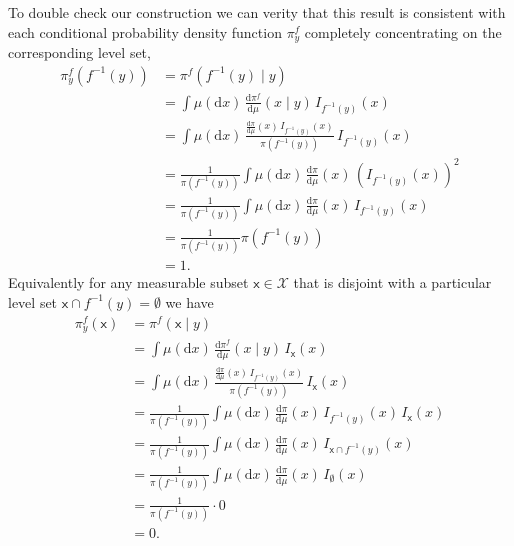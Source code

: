 \documentclass[
  letterpaper,
  DIV=11,
  numbers=noendperiod]{scrartcl}
\begin{document}
To double check our construction we can verity that this result is
consistent with each conditional probability density function
\(\pi^{f}_{y}\) completely concentrating on the corresponding level set,
\begin{align*}
\pi^{f}_{y}( f^{-1}(y) )
&=
\pi^{f}( f^{-1}(y) \mid y)
\\
&=
\int \mu( \mathrm{d} x) \, \frac{ \mathrm{d}  \pi^{f} }{ \mathrm{d}  \mu  }( x \mid y ) \,
I_{f^{-1}(y)}(x)
\\
&=
\int \mu( \mathrm{d} x) \,
\frac{ \frac{ \mathrm{d}  \pi }{ \mathrm{d}  \mu  }(x) \, I_{f^{-1}(y)}(x) }{ \pi ( f^{-1}(y) ) }
\,
I_{f^{-1}(y)}(x)
\\
&=
\frac{1}{ \pi ( f^{-1}(y) ) }
\int \mu( \mathrm{d} x) \, \frac{ \mathrm{d}  \pi }{ \mathrm{d}  \mu  }(x) \,
\left( I_{f^{-1}(y)}(x) \right)^{2}
\\
&=
\frac{1}{ \pi ( f^{-1}(y) ) }
\int \mu( \mathrm{d} x) \, \frac{ \mathrm{d}  \pi }{ \mathrm{d}  \mu  }(x) \,
I_{f^{-1}(y)}(x)
\\
&=
\frac{1}{ \pi ( f^{-1}(y) ) }
\pi( f^{-1}(y) )
\\
&=
1.
\end{align*} Equivalently for any measurable subset
\(\mathsf{x} \in \mathcal{X}\) that is disjoint with a particular level
set \(\mathsf{x} \cap f^{-1}(y) = \emptyset\) we have \begin{align*}
\pi^{f}_{y}( \mathsf{x} )
&=
\pi^{f}( \mathsf{x} \mid y)
\\
&=
\int \mu( \mathrm{d} x) \, \frac{ \mathrm{d}  \pi^{f} }{ \mathrm{d}  \mu  }( x \mid y ) \,
I_{\mathsf{x}}(x)
\\
&=
\int \mu( \mathrm{d} x) \,
\frac{ \frac{ \mathrm{d}  \pi }{ \mathrm{d}  \mu  }(x) \, I_{f^{-1}(y)}(x) }{ \pi ( f^{-1}(y) ) }
\,
I_{\mathsf{x}}(x)
\\
&=
\frac{1}{ \pi ( f^{-1}(y) ) }
\int \mu( \mathrm{d} x) \, \frac{ \mathrm{d}  \pi }{ \mathrm{d}  \mu  }(x) \,
I_{f^{-1}(y)}(x) \, I_{\mathsf{x}}(x)
\\
&=
\frac{1}{ \pi ( f^{-1}(y) ) }
\int \mu( \mathrm{d} x) \, \frac{ \mathrm{d}  \pi }{ \mathrm{d}  \mu  }(x) \,
I_{\mathsf{x} \cap f^{-1}(y) }(x)
\\
&=
\frac{1}{ \pi ( f^{-1}(y) ) }
\int \mu( \mathrm{d} x) \, \frac{ \mathrm{d}  \pi }{ \mathrm{d}  \mu  }(x) \,
I_{ \emptyset }(x)
\\
&=
\frac{1}{ \pi ( f^{-1}(y) ) } \cdot 0
\\
&=
0.
\end{align*}
\end{document}

